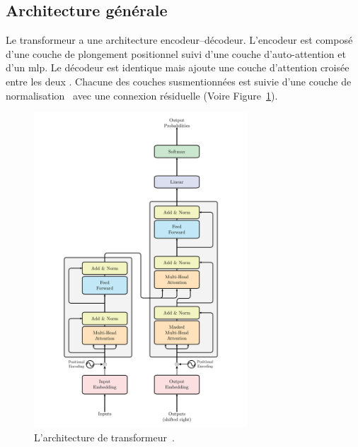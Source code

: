 \subsection{Architecture générale}

Le transformeur a une architecture encodeur--décodeur.
L'encodeur est composé d'une couche de plongement positionnel 
suivi d'une couche d'auto-attention et d'un \gls{mlp}.
Le décodeur est identique mais ajoute une couche d'attention croisée entre les deux . 
Chacune des couches susmentionnées est suivie d'une couche de normalisation~\cite{Ba_Kiros_Hinton_2016}
avec une connexion résiduelle (Voire Figure~\ref{fig.transformer}).

\begin{figure}[htb]
    \centering
    \includegraphics[width=8cm]{assets/images/transformer.png}
    \caption[L'architecture de transformeur.]%
    {L'architecture de transformeur~\cite[Fig 1]{attention}.}
    \label{fig.transformer}
\end{figure}

